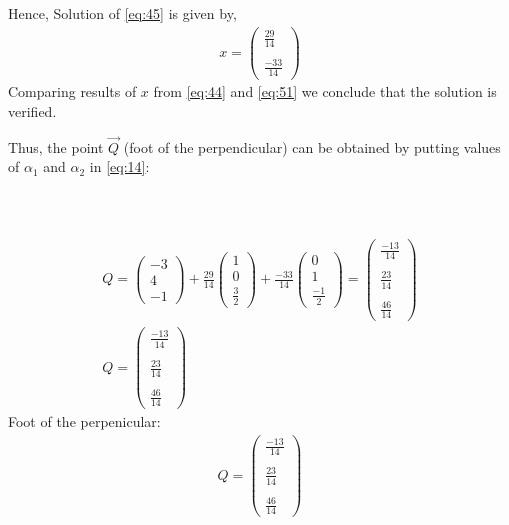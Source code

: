 \documentclass[journal,12pt,twocolumn]{IEEEtran}
\newcommand{\myvec}[1]{\ensuremath{\begin{pmatrix}#1\end{pmatrix}}}
\begin{document}
Hence, Solution of \eqref{eq:45} is given by,
\begin{align}
x=\myvec{\frac{29}{14}\\\\\frac{-33}{14}}\label{eq:51}
\end{align}
Comparing results of $x$ from \eqref{eq:44} and \eqref{eq:51} we conclude that the solution is verified.


Thus, the point $\vec{Q}$ (foot of the perpendicular) can be obtained by putting values of $\alpha_1$ and $\alpha_2$ in \eqref{eq:14}:\\\\\\\\
\begin{align}
    Q = \myvec{-3\\4\\-1} + \frac{29}{14}\myvec{1 \\ 0 \\\frac{3}{2}} +  \frac{-33}{14}\myvec{ 0 \\ 1 \\\frac{-1}{2}}=\myvec{\frac{-13}{14}\\\\\frac{23}{14}\\\\\frac{46}{14}}\\
    \boxed{Q = \myvec{\tfrac{-13}{14}\\\\\tfrac{23}{14}\\\\\tfrac{46}{14}}}
\end{align}
Foot of the perpenicular:
\begin{align}
\boxed{Q = \myvec{\tfrac{-13}{14}\\\\\tfrac{23}{14}\\\\\tfrac{46}{14}}}
\end{align}
\end{document}
